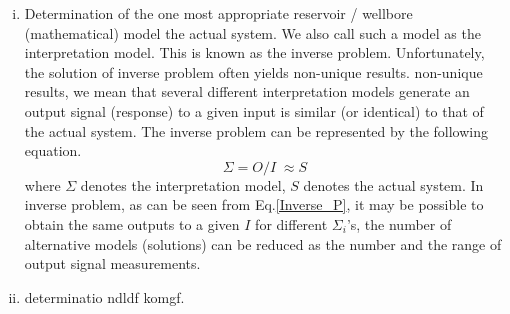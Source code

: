 \documentclass{llncs}
\begin{document}
\begin{enumerate}[(i)]
\item Determination of the one most appropriate reservoir / wellbore (mathematical) model  the actual system. We also call such a model as the interpretation model.  This is known as the inverse problem.  Unfortunately, the solution of inverse problem often yields non-unique results.  non-unique results, we mean that several different interpretation models  generate an output signal (response) to a given input  is similar (or identical) to that of the actual system. The inverse problem can be represented by the following equation.
    \begin{equation}
    \Sigma ={O}/{I}\;\approx S
    \label{Inverse_P}
    \end{equation} 
    where $\Sigma$ denotes the interpretation model, $S$ denotes the actual system. In inverse problem, as can be seen from Eq.\ref{Inverse_P}, it may be possible to obtain the same outputs to a given $I$ for different $\Sigma_{i}$'s, the number of alternative models (solutions) can be reduced as the number and the range of output signal measurements.
    
\item determinatio ndldf komgf. 
\end{enumerate}





%
\end{document}
